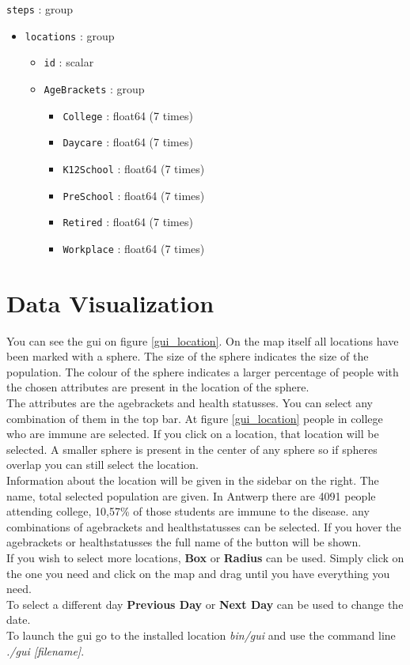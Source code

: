 \texttt{steps} : group
\begin{itemize}
\item \texttt{locations} : group
\begin{itemize}
\item \texttt{id} : scalar
\item \texttt{AgeBrackets} : group
\begin{itemize}
\item \texttt{College} : float64 (7 times)
\item \texttt{Daycare} : float64 (7 times)
\item \texttt{K12School} : float64 (7 times)
\item \texttt{PreSchool} : float64 (7 times)
\item \texttt{Retired} : float64 (7 times)
\item \texttt{Workplace} : float64 (7 times)
\end{itemize}
\end{itemize}
\end{itemize}




\section{Data Visualization}
You can see the gui on figure \ref{gui_location}. On the map itself all locations have been marked with a sphere. The size of the sphere indicates the size of the population. The colour of the sphere indicates a larger percentage of people with the chosen attributes are present in the location of the sphere. \\
The attributes are the agebrackets and health statusses. You can select any combination of them in the top bar. At figure \ref{gui_location} people in college who are immune are selected. If you click on a location, that location will be selected. A smaller sphere is present in the center of any sphere so if spheres overlap you can still select the location.\\ Information about the location will be given in the sidebar on the right. The name, total selected population are given. In Antwerp there are 4091 people attending college, 10,57\% of those students are immune to the disease. any combinations of agebrackets and healthstatusses can be selected. If you hover the agebrackets or healthstatusses the full name of the button will be shown. \\
If you wish to select more locations, \textbf{Box} or \textbf{Radius} can be used. Simply click on the one you need and click on the map and drag until you have everything you need.\\
To select a different day \textbf{Previous Day} or \textbf{Next Day} can be used to change the date.\\
To launch the gui go to the installed location \textit{bin/gui} and use the command line \textit{./gui [filename]}. 

